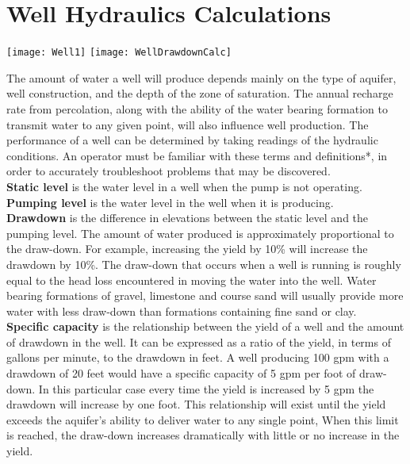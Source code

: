 \section{Well Hydraulics Calculations} 

\begin{center}
\texttt{[image: Well1]} \hspace{1cm} \texttt{[image: WellDrawdownCalc]}
\end{center}

The amount of water a well will produce depends mainly on the type of aquifer, well construction, and the depth of the zone of saturation. The annual recharge rate from percolation, along with the ability of the water bearing formation to transmit water to any given point, will also influence well production. The performance of a well can be determined by taking readings of the hydraulic conditions. An operator must be familiar with these terms and definitions*, in order to accurately troubleshoot problems that may be discovered.\\
\vspace{0.3cm}
\textbf{Static level }is the water level in a well when the pump is not operating.\\
\vspace{0.3cm}
\textbf{Pumping level} is the water level in the well when it is producing.\\
\vspace{0.3cm}
\textbf{Drawdown} is the difference in elevations between the static level and the pumping level. The amount of water produced is approximately proportional to the draw-down. For example, increasing the yield by 10\% will increase the drawdown by 10\%. The draw-down that occurs when a well is running is roughly equal to the head loss encountered in moving the water into the well. Water bearing formations of gravel, limestone and course sand will usually provide more water with less draw-down than formations containing fine sand or clay.\\
\vspace{0.3cm}
\textbf{Specific capacity} is the relationship between the yield of a well and the amount of drawdown in the well. It can be expressed as a ratio of the yield, in terms of gallons per minute, to the drawdown in feet. A well producing 100 gpm with a drawdown of 20 feet would have a specific capacity of 5 gpm per foot of draw-down. In this particular case every time the yield is increased by 5 gpm the drawdown will increase by one foot. This relationship will exist until the yield exceeds the aquifer’s ability to deliver water to any single point, When this limit is reached, the draw-down increases dramatically with little or no increase in the yield.\\
